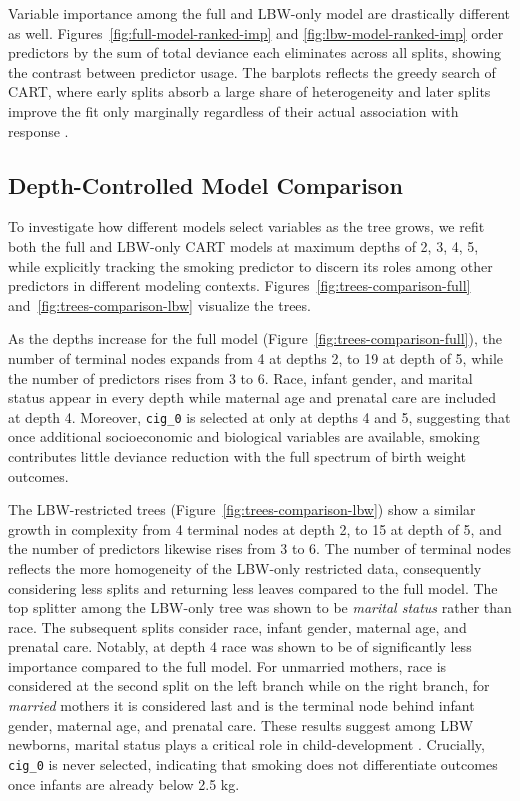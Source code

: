 Variable importance among the full and LBW-only model are drastically different as well. Figures~\ref{fig:full-model-ranked-imp} and \ref{fig:lbw-model-ranked-imp} order predictors by the sum of total deviance each eliminates across all splits, showing the contrast between predictor usage. The barplots reflects the greedy search of CART, where early splits absorb a large share of heterogeneity and later splits improve the fit only marginally regardless of their actual association with response \parencite{cart_greedy}.   

\subsection{Depth-Controlled Model Comparison}
\label{sec:ch3-comparison-depth}

To investigate how different models select variables as the tree grows, we refit both the full and LBW-only CART models at maximum depths of 2, 3, 4, 5, while explicitly tracking the smoking predictor to discern its roles among other predictors in different modeling contexts. Figures~\ref{fig:trees-comparison-full} and~\ref{fig:trees-comparison-lbw} visualize the trees.

As the depths increase for the full model (Figure~\ref{fig:trees-comparison-full}), the number of terminal nodes expands from 4 at depths 2, to 19 at depth of 5, while the number of predictors rises from 3 to 6. Race, infant gender, and marital status appear in every depth while maternal age and prenatal care are included at depth 4. Moreover,  \texttt{cig\_0} is selected at only at depths 4 and 5, suggesting that once additional socioeconomic and biological variables are available, smoking contributes little deviance reduction with the full spectrum of birth weight outcomes. 

The LBW-restricted trees (Figure~\ref{fig:trees-comparison-lbw}) show a similar growth in complexity from 4 terminal nodes at depth 2, to 15 at depth of 5, and the number of predictors likewise rises from 3 to 6. The number of terminal nodes reflects the more homogeneity of the LBW-only restricted data, consequently considering less splits and returning less leaves compared to the full model. The top splitter among the LBW-only tree was shown to be \emph{marital status} rather than race. The subsequent splits consider race, infant gender, maternal age, and prenatal care. Notably, at depth 4 race was shown to be of significantly less importance compared to the full model. For unmarried mothers, race is considered at the second split on the left branch while on the right branch, for \emph{married} mothers it is considered last and is the terminal node behind infant gender, maternal age, and prenatal care. These results suggest among LBW newborns, marital status plays a critical role in child-development \parencite{marriage_lbw}. Crucially, \texttt{cig\_0} is never selected, indicating that smoking does not differentiate outcomes once infants are already below 2.5 kg. 

